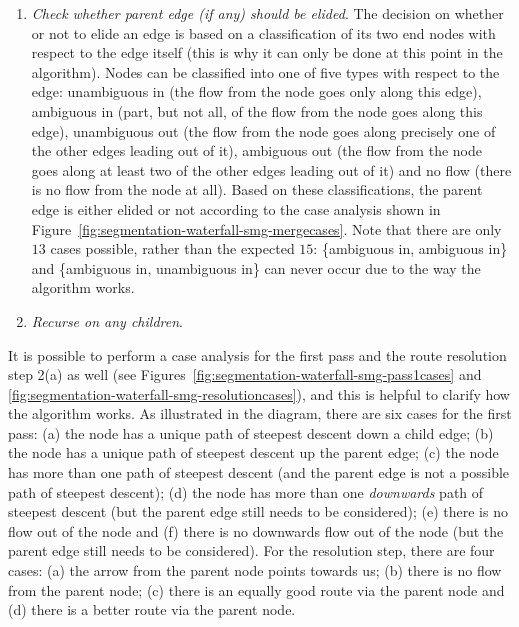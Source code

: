 \begin{enumerate}
\begin{enumerate}
\item \emph{Check whether parent edge (if any) should be elided}. The decision on whether or not to elide an edge is based on a classification of its two end nodes with respect to the edge itself (this is why it can only be done at this point in the algorithm). Nodes can be classified into one of five types with respect to the edge: unambiguous in (the flow from the node goes only along this edge), ambiguous in (part, but not all, of the flow from the node goes along this edge), unambiguous out (the flow from the node goes along precisely one of the other edges leading out of it), ambiguous out (the flow from the node goes along at least two of the other edges leading out of it) and no flow (there is no flow from the node at all). Based on these classifications, the parent edge is either elided or not according to the case analysis shown in Figure~\ref{fig:segmentation-waterfall-smg-mergecases}. Note that there are only $13$ cases possible, rather than the expected $15$: \{ambiguous in, ambiguous in\} and \{ambiguous in, unambiguous in\} can never occur due to the way the algorithm works.

\item \emph{Recurse on any children}.

\end{enumerate}

\end{enumerate}


It is possible to perform a case analysis for the first pass and the route resolution step 2(a) as well (see Figures~\ref{fig:segmentation-waterfall-smg-pass1cases} and \ref{fig:segmentation-waterfall-smg-resolutioncases}), and this is helpful to clarify how the algorithm works. As illustrated in the diagram, there are six cases for the first pass: (a) the node has a unique path of steepest descent down a child edge; (b) the node has a unique path of steepest descent up the parent edge; (c) the node has more than one path of steepest descent (and the parent edge is not a possible path of steepest descent); (d) the node has more than one \emph{downwards} path of steepest descent (but the parent edge still needs to be considered); (e) there is no flow out of the node and (f) there is no downwards flow out of the node (but the parent edge still needs to be considered). For the resolution step, there are four cases: (a) the arrow from the parent node points towards us; (b) there is no flow from the parent node; (c) there is an equally good route via the parent node and (d) there is a better route via the parent node.

